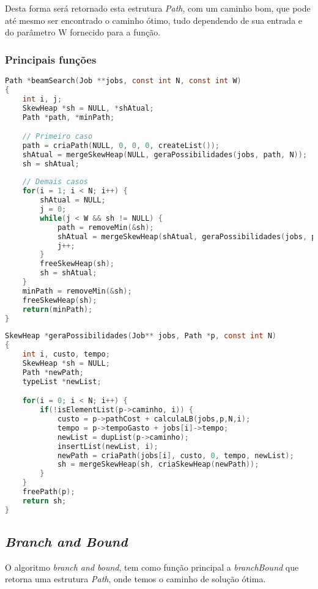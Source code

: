 \documentclass[
	11pt,				%
	oneside,			%
	a4paper,			%
	english,			%
	brazil,				%
	]{article}
\begin{document}
Desta forma será retornado esta estrutura \textit{Path}, com um caminho bom, que pode até mesmo ser encontrado o caminho ótimo, tudo dependendo de sua entrada e do parâmetro W fornecido para a função.

\subsubsection{Principais funções}
\begin{lstlisting}[language=C, caption=Função beamSearch]
Path *beamSearch(Job **jobs, const int N, const int W)
{
    int i, j;
    SkewHeap *sh = NULL, *shAtual;
    Path *path, *minPath;

    // Primeiro caso
    path = criaPath(NULL, 0, 0, 0, createList());
    shAtual = mergeSkewHeap(NULL, geraPossibilidades(jobs, path, N));
    sh = shAtual;
    
    // Demais casos
    for(i = 1; i < N; i++) {
        shAtual = NULL;
        j = 0;
        while(j < W && sh != NULL) {
            path = removeMin(&sh);
            shAtual = mergeSkewHeap(shAtual, geraPossibilidades(jobs, path, N));
            j++;
        }
        freeSkewHeap(sh);
        sh = shAtual;
    }
    minPath = removeMin(&sh);
    freeSkewHeap(sh);
    return(minPath);
}
\end{lstlisting}

\begin{lstlisting}[language=C, caption=Função geraPossibilidades]
SkewHeap *geraPossibilidades(Job** jobs, Path *p, const int N)
{
    int i, custo, tempo;
    SkewHeap *sh = NULL;
    Path *newPath;
    typeList *newList;

    for(i = 0; i < N; i++) {
        if(!isElementList(p->caminho, i)) {
            custo = p->pathCost + calculaLB(jobs,p,N,i);
            tempo = p->tempoGasto + jobs[i]->tempo;
            newList = dupList(p->caminho);
            insertList(newList, i);
            newPath = criaPath(jobs[i], custo, 0, tempo, newList);
            sh = mergeSkewHeap(sh, criaSkewHeap(newPath));
        }
    }
    freePath(p);
    return sh;
}
\end{lstlisting}

\subsection{\textit{Branch and Bound}}
O algoritmo \textit{branch and bound}, tem como função principal a \textit{branchBound} que retorna uma estrutura \textit{Path}, onde temos o caminho de solução ótima.
\end{document}
